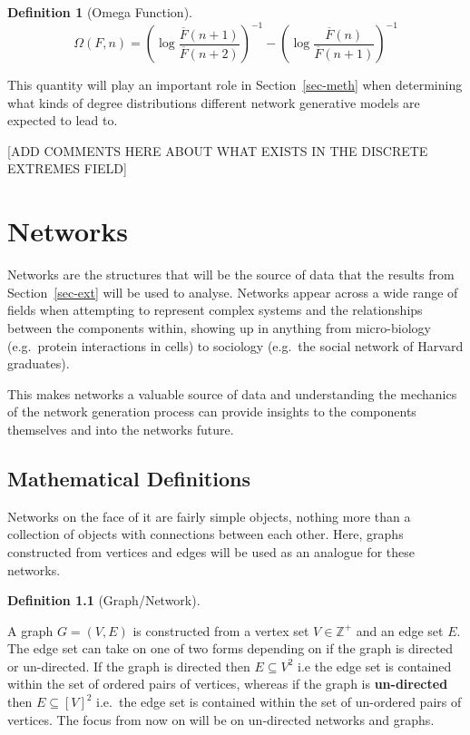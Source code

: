 \documentclass[
  10pt,
  a4paper,
]{scrreprt}
\theoremstyle{definition}
\newtheorem{definition}{Definition}[section]
\theoremstyle{plain}
\theoremstyle{remark}
\begin{document}
{\begin{definition}[Omega
Function]
\[
\Omega(F,n) = \left(\log\frac{\overline F (n+1)}{\overline F (n+2)}\right)^{-1} - \left(\log\frac{\overline F (n)}{\overline F (n+1)}\right)^{-1}
\]

\end{definition}

This quantity will play an important role in Section~\ref{sec-meth} when
determining what kinds of degree distributions different network
generative models are expected to lead to.

{[}ADD COMMENTS HERE ABOUT WHAT EXISTS IN THE DISCRETE EXTREMES FIELD{]}

\hypertarget{networks}{%
\chapter{Networks}\label{networks}}

Networks are the structures that will be the source of data that the
results from Section~\ref{sec-ext} will be used to analyse. Networks
appear across a wide range of fields when attempting to represent
complex systems and the relationships between the components within,
showing up in anything from micro-biology (e.g.~protein interactions in
cells) to sociology (e.g.~the social network of Harvard graduates).

This makes networks a valuable source of data and understanding the
mechanics of the network generation process can provide insights to the
components themselves and into the networks future.

\hypertarget{mathematical-definitions}{%
\section{Mathematical Definitions}\label{mathematical-definitions}}

Networks on the face of it are fairly simple objects, nothing more than
a collection of objects with connections between each other. Here,
graphs constructed from vertices and edges will be used as an analogue
for these networks.

\begin{definition}[Graph/Network]\protect\hypertarget{def-net}{}\label{def-net}

A graph \(G = (V,E)\) is constructed from a vertex set
\(V\in\mathbb Z^+\) and an edge set \(E\). The edge set can take on one
of two forms depending on if the graph is directed or un-directed. If
the graph is directed then \(E\subseteq V^2\) i.e the edge set is
contained within the set of ordered pairs of vertices, whereas if the
graph is \textbf{un-directed} then \(E\subseteq [V]^2\) i.e.~the edge
set is contained within the set of un-ordered pairs of vertices. The
focus from now on will be on un-directed networks and graphs.


\end{definition}}
\end{document}
